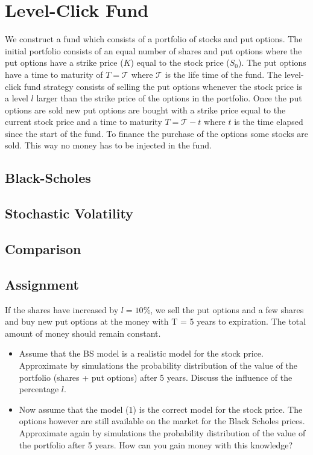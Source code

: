 \documentclass[11pt]{article}
\begin{document}
\section{Level-Click Fund}
We construct a fund which consists of a portfolio of stocks and put options.
The initial portfolio consists of an equal number of shares and put options
where the put options have a strike price ($K$) equal to the stock price
($S_0$). The put options have a time to maturity of $T = \mathcal{T}$ where
$\mathcal{T}$ is the life time of the fund. The level-click fund strategy
consists of selling the put options whenever the stock price is a level $l$
larger than the strike price of the options in the portfolio. Once the put
options are sold new put options are bought with a strike price equal to the
current stock price and a time to maturity $T = \mathcal{T} - t$ where $t$ is
the time elapsed since the start of the fund. To finance the purchase of the
options some stocks are sold. This way no money has to be injected in the
fund.

\subsection{Black-Scholes}

\subsection{Stochastic Volatility}

\subsection{Comparison}


\subsection{Assignment}
If the shares have increased by $l = 10$\%, we sell the put options and a few
shares and buy new put options at the money with T = 5 years to expiration.
The total amount of money should remain constant.

\begin{itemize}
\item
Assume that the BS model is a realistic model for the stock price. Approximate
by simulations the probability distribution of the value of the portfolio
(shares + put options) after 5 years. Discuss the influence of the percentage
$l$.
\item
Now assume that the model ($1$) is the correct model for the stock price. The
options however are still available on the market for the Black Scholes
prices. Approximate again by simulations the probability distribution of the
value of the portfolio after 5 years. How can you gain money with this
knowledge?
\end{itemize}
\end{document}
